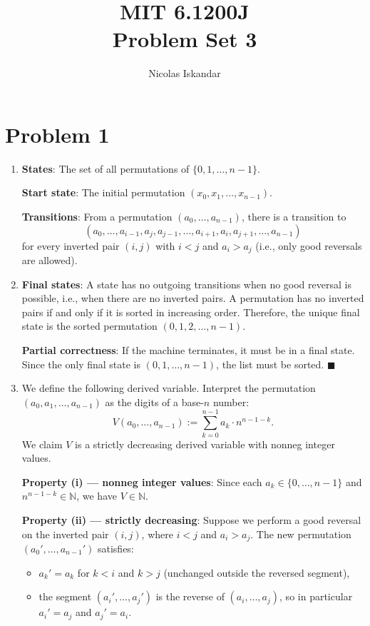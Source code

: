 \documentclass[11pt]{article}
\title{
    \vspace{-2em}
    MIT 6.1200J \\
    Problem Set 3
}
\author{Nicolas Iskandar}
\date{}
\begin{document}
\maketitle

\section*{Problem 1}

\begin{enumerate}[label=\textbf{(\alph*)}]

\item \textbf{States}: The set of all permutations of $\{0, 1, \ldots, n-1\}$.

\textbf{Start state}: The initial permutation $(x_0, x_1, \ldots, x_{n-1})$.

\textbf{Transitions}: From a permutation $(a_0, \ldots, a_{n-1})$, there is a
transition to
\[
(a_0, \ldots, a_{i-1}, a_j, a_{j-1}, \ldots, a_{i+1}, a_i,
a_{j+1}, \ldots, a_{n-1})
\]
for every inverted pair $(i,j)$ with $i<j$ and $a_i>a_j$
(i.e., only good reversals are allowed).

\item \textbf{Final states}: A state has no outgoing transitions when no good
reversal is possible, i.e., when there are no inverted pairs. A permutation has no
inverted pairs if and only if it is sorted in increasing order. Therefore, the unique
final state is the sorted permutation $(0, 1, 2, \ldots, n-1)$.

\textbf{Partial correctness}: If the machine terminates, it must be in a final
state. Since the only final state is $(0, 1, \ldots, n-1)$, the list must be
sorted. $\blacksquare$

\item We define the following derived variable. Interpret the permutation
$(a_0, a_1, \ldots, a_{n-1})$ as the digits of a base-$n$ number:
\[
    V(a_0, \ldots, a_{n-1}) := \sum_{k=0}^{n-1} a_k \cdot n^{n-1-k}.
\]
We claim $V$ is a strictly decreasing derived variable with nonneg integer values.

\textbf{Property (i) --- nonneg integer values}: Since each $a_k \in \{0, \ldots,
n-1\}$ and $n^{n-1-k} \in \mathbb{N}$, we have $V \in \mathbb{N}$. \checkmark

\textbf{Property (ii) --- strictly decreasing}: Suppose we perform a good reversal
on the inverted pair $(i, j)$, where $i < j$ and $a_i > a_j$. The new permutation
$(a_0', \ldots, a_{n-1}')$ satisfies:
\begin{itemize}
    \item $a_k' = a_k$ for $k < i$ and $k > j$ (unchanged outside the reversed
    segment),
    \item the segment $(a_i', \ldots, a_j')$ is the reverse of $(a_i, \ldots, a_j)$,
    so in particular $a_i' = a_j$ and $a_j' = a_i$.
\end{itemize}


\end{enumerate}
\end{document}

